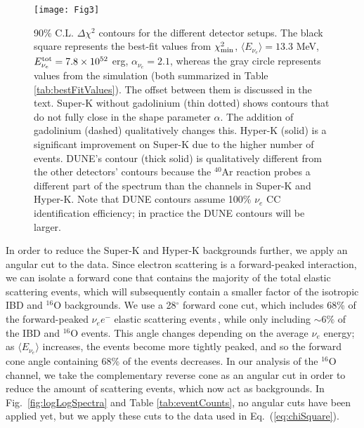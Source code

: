 \documentclass[aps,reprint,superscriptaddress]{revtex4-1}
\begin{document}
\begin{figure*}[]
\centering
\texttt{[image: Fig3]}
\caption{90\% C.L. $\Delta\chi^{2}$ contours for the different detector setups. The black square represents the best-fit values from $\chi^{2}_{\rm min}$, $\langle E_{\nu_{e}}\rangle=13.3$ MeV, $E_{\nu_{e}}^{\rm tot}=7.8\times10^{52}$ erg, $\alpha_{\nu_{e}}=2.1$, whereas the gray circle represents values from the simulation (both summarized in Table \ref{tab:bestFitValues}). The offset between them is discussed in the text. Super-K without gadolinium (thin dotted) shows contours that do not fully close in the shape parameter $\alpha$. The addition of gadolinium (dashed) qualitatively changes this. Hyper-K (solid) is a significant improvement on Super-K due to the higher number of events. DUNE's contour (thick solid) is qualitatively different from the other detectors' contours because the $^{40}$Ar reaction probes a different part of the spectrum than the channels in Super-K and Hyper-K. Note that DUNE contours assume 100\% $\nu_e$ CC identification efficiency; in practice the DUNE contours will be larger.}
\label{fig:csTriPlot_All}
\end{figure*}

In order to reduce the Super-K and Hyper-K backgrounds further, we apply an angular cut to the data.  Since electron scattering is a forward-peaked interaction, we can isolate a forward cone that contains the majority of the total elastic scattering events, which will subsequently contain a smaller factor of the isotropic IBD and $^{16}$O backgrounds.  We use a 28$^\circ$ forward cone cut, which includes 68\% of the forward-peaked $\nu_{e}e^-$ elastic scattering events\,\cite{Abe:2010hy}, while only including $\sim 6\%$ of the IBD and $^{16}$O events. This angle changes depending on the average $\nu_{e}$ energy; as $\langle E_{\nu_{e}}\rangle$ increases, the events become more tightly peaked, and so the forward cone angle containing 68\% of the events decreases. In our analysis of the $^{16}$O channel, we take the complementary reverse cone as an angular cut in order to reduce the amount of scattering events, which now act as backgrounds. In Fig.~\ref{fig:logLogSpectra} and Table \ref{tab:eventCounts}, no angular cuts have been applied yet, but we apply these cuts to the data used in Eq.~(\ref{eq:chiSquare}).
\end{document}
